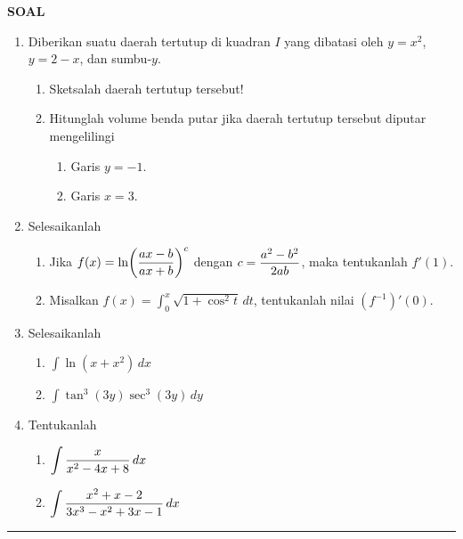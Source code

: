 \begin{center}
\textbf{\large{SOAL}}
\end{center}
\begin{enumerate}[leftmargin=*, label={\arabic*}.]
\item Diberikan suatu daerah tertutup di kuadran $I$ yang dibatasi oleh $y=x^{2}$, 
$y=2-x$, dan sumbu-$y$.
    \begin{enumerate}[label={\alph*}.]
    \item Sketsalah daerah tertutup tersebut!
    \item Hitunglah volume benda putar jika daerah tertutup tersebut 
    diputar mengelilingi
        \begin{enumerate}[label={\roman*}.]
        \item Garis $y=-1$.
        \item Garis $x=3$.
        \end{enumerate}
    \end{enumerate}
\item Selesaikanlah
    \begin{enumerate}[label={\alph*}.]
    \item Jika $\ds f(x) = \ln\brk*{\frac{ax-b}{ax+b}}^{c}$ dengan 
    $\displaystyle c=\frac{a^{2}-b^{2}}{2ab}$, maka tentukanlah $f'(1)$.
    \item Misalkan $f(x)=\int_0^{x}\sqrt{1+\cos^{2}t}\,dt$, tentukanlah 
    nilai $(f^{-1})'(0)$.
    \end{enumerate}
\item Selesaikanlah
    \begin{enumerate}[label={\alph*}.]
    \item $\int \ln (x+x^{2})\,dx$
    \item $\int \tan^{3}(3y)\sec^{3}(3y)\,dy$
    \end{enumerate}
\item Tentukanlah
    \begin{enumerate}[label={\alph*}.]
    \item $\displaystyle \int \frac{x}{x^{2}-4x+8}\,dx$
    \item $\displaystyle \int \frac{x^{2}+x-2}{3x^{3}-x^{2}+3x-1}\,dx$
    \end{enumerate}
\end{enumerate}


\vspace{0.2cm}\hrule height 1pt\vspace{0.5cm}


